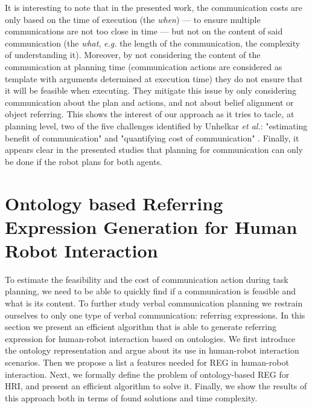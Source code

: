 \documentclass[a4paper,11pt,twoside]{StyleThese}
\begin{document}
It is interesting to note that in the presented work, the communication costs are only based on the time of execution (the \textit{when}) --- to ensure multiple communications are not too close in time --- but not on the content of said communication (the \textit{what}, \textit{e.g.} the length of the communication, the complexity of understanding it). Moreover, by not considering the content of the communication at planning time (communication actions are considered as template with arguments determined at execution time) they do not ensure that it will be feasible when executing. They mitigate this issue by only considering communication about the plan and actions, and not about belief alignment or object referring. This shows the interest of our approach as it tries to tacle, at planning level, two of the five challenges identified by Unhelkar \textit{et al.}: "estimating benefit of communication" and "quantifying cost of communication" \cite{unhelkar2017challenges}.
Finally, it appears clear in the presented studies that planning for communication can only be done if the robot plans for both agents.


\section[Referring Expression Generation for HRI]{Ontology based Referring Expression Generation for Human Robot Interaction}
To estimate the feasibility and the cost of communication action during task planning, we need to be able to quickly find if a communication is feasible and what is its content. To further study verbal communication planning we restrain ourselves to only one type of verbal communication: referring expressions.
In this section we present an efficient algorithm that is able to generate referring expression for human-robot interaction based on ontologies. We first introduce the ontology representation and argue about its use in human-robot interaction scenarios. Then we propose a list a features needed for REG in human-robot interaction. Next, we formally define the problem of ontology-based REG for HRI, and present an efficient algorithm to solve it. Finally, we show the results of this approach both in terms of found solutions and time complexity.
\end{document}
